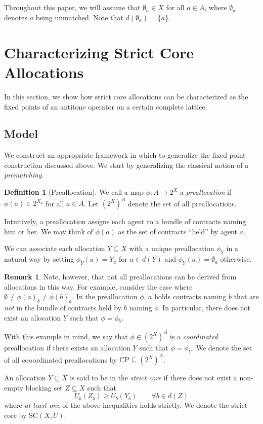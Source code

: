\documentclass[11pt,reqno]{amsart}
\theoremstyle{definition}
\newtheorem{defn}[thm]{Definition}
\newtheorem{remark}[thm]{Remark}
\numberwithin{equation}{section}
\newcommand{\pre}{\phi}
\newcommand{\coordpre}{\mathrm{CP}}
\newcommand{\prealloc}{(2^X)^A}
\newcommand{\sub}{\subseteq}
\newcommand{\strcore}{\mathrm{SC}(X,U)}
\begin{document}
Throughout this paper, we will assume that $\emptyset_a \in X$ for all $a \in A$, where $\emptyset_a$ denotes $a$ being unmatched. Note that $d(\emptyset_a) = \{a\}$. 

\section{Characterizing Strict Core Allocations} \label{section:strcore}
In this section, we show how strict core allocations can be characterized as the fixed points of an antitone operator on a certain complete lattice.

\subsection{Model}
We construct an appropriate framework in which to generalize the fixed point construction discussed above. 
We start by generalizing the classical notion of a \emph{prematching}. 

\begin{defn}[Preallocation] We call a map $\pre: A \to 2^X$ a \emph{preallocation} if $\pre(a) \in 2^{X_a}$ for all $a\in A$. Let $(2^X)^A$ denote the set of all preallocations.  
\end{defn}

Intuitively, a preallocation assigns each agent to a bundle of contracts naming him or her. We may think of $\pre(a)$ as the set of contracts ``held'' by agent $a$.   

We can associate each allocation $Y\subseteq X$ with a unique preallocation $\pre_Y$ in a natural way by setting $\pre_Y(a) = Y_a$ for $a \in d(Y)$ and $\pre_Y(a) = \emptyset_a$ otherwise.
\begin{remark} Note, however, that not all preallocations can be derived from allocations in this way.
For example, consider the case where $\emptyset \not = \pre(a)_b \not = \pre(b)_a$. In the preallocation $\pre$, $a$ holds contracts naming $b$ that are \emph{not} in the bundle of contracts held by $b$ naming $a$.  
In particular, there does not exist an allocation $Y$ such that $\pre = \pre_Y$. 
\end{remark}

With this example in mind, we say that $\pre \in \prealloc$ is a \emph{coordinated} preallocation if there exists an allocation $Y$ such that $\pre = \pre_Y$. 
We denote the set of all cooordinated preallocations by $\coordpre\sub \prealloc$.

An allocation $Y \sub X$ is said to be in the \emph{strict core} if there does not exist a non-empty blocking set $Z \sub X$ such that 
\[
U_b(Z_b) \geq U_b(Y_b) \qquad  \forall b\in d(Z)
\]
where \emph{at least one} of the above inequalities holds strictly.
We denote the strict core by $\strcore$. 
\end{document}
